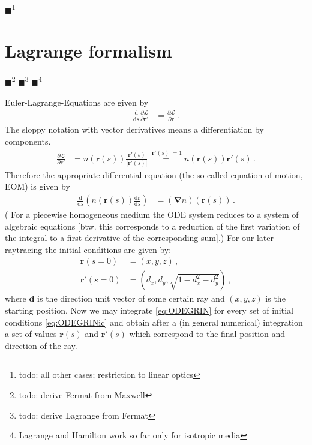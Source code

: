 \documentclass[12pt,a4paper,twoside,openright,BCOR10mm,headsepline,titlepage,abstracton,chapterprefix,final]{scrreprt}
\newcommand\Vector[1]{{\mathbf{#1}}}
\newcommand{\remark}[1]{{\color{red}$\blacksquare$}\footnote{{\color{red}#1}}}
\renewcommand\d{\textrm{d}}
\begin{document}
\remark{todo: all other cases; restriction to linear optics}

\section{Lagrange formalism}
\remark{todo: derive Fermat from Maxwell}
\remark{todo: derive Lagrange from Fermat}
\remark{Lagrange and Hamilton work so far only for isotropic media}

Euler-Lagrange-Equations are given by
\begin{align}
 \frac{\d }{\d s} \frac{\partial \mathcal{L}}{\partial \Vector{r}'} &= \frac{\partial \mathcal{L}}{\partial \Vector{r}}\,.
\end{align}
The sloppy notation with vector derivatives means a differentiation by components.
\begin{align}
 \frac{\partial \mathcal{L}}{\partial \Vector{r}'} &= n(\Vector{r}(s)) \frac{\Vector{r}'(s)}{|\Vector{r}'(s)|} \stackrel{|\Vector{r}'(s)|=1}{=} n(\Vector{r}(s))\Vector{r}'(s)\,.
\end{align}
Therefore the appropriate differential equation (the so-called equation of motion, EOM) is given by
\begin{align}
 \frac{\d }{\d s} \left(n(\Vector{r}(s)) \frac{\d \Vector{r}}{\d s}\right) &= (\Vector{\nabla} n)(\Vector{r}(s)) \label{eq:ODEGRIN}\,.
\end{align}
( For a piecewise homogeneous medium the ODE system reduces to a system of algebraic equations 
[btw. this corresponds to a reduction of the
first variation of the integral to a first derivative of the corresponding sum].) 
For our later raytracing the initial conditions are given by:
\begin{subequations}
\label{eq:ODEGRINic}
\begin{align}
 \Vector{r}(s=0) &= (x,y,z)\,,\\
 \Vector{r}'(s=0) &= (d_x, d_y, \sqrt{1-d_x^2-d_y^2})\,,
\end{align}
\end{subequations}
where $\Vector{d}$ is the direction unit vector of some certain ray and $(x,y,z)$ is the starting position.
Now we may integrate \eqref{eq:ODEGRIN} for every set of initial conditions \eqref{eq:ODEGRINic}
and obtain after a (in general numerical) integration a set of values $\Vector{r}(s)$ and $\Vector{r}'(s)$
which correspond to the final position and direction of the ray.
\end{document}
